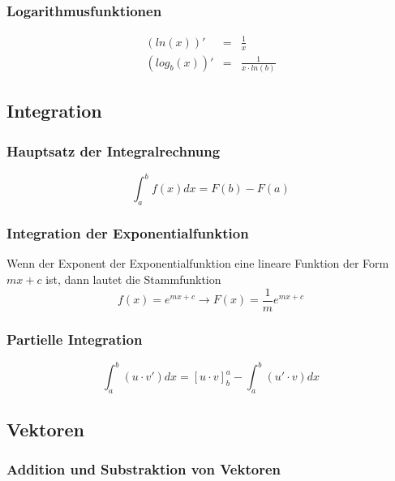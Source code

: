 \subsubsection{Logarithmusfunktionen}
\label{ssub:logarithmusfunktionen}	
\begin{eqnarray}
	(ln(x))' &=& \frac{1}{x} \\
	(log_b(x))' &=& \frac{1}{x \cdot ln(b)}
\end{eqnarray}	

\subsection{Integration} 
\label{sub:integration}

\subsubsection{Hauptsatz der Integralrechnung} 
\label{ssub:hauptsatz_der_integralrechnung}

\begin{equation}
	\int_a^b f(x)dx = F(b) - F(a)
\end{equation}

\subsubsection{Integration der Exponentialfunktion}
\label{ssub:integration_der_exponentialfunktion}

Wenn der Exponent der Exponentialfunktion eine lineare Funktion der Form $mx+c$ ist, dann lautet die Stammfunktion
\begin{equation}
	f(x) = e^{mx+c} \rightarrow F(x) = \frac{1}{m} e^{mx+c}
\end{equation}

\subsubsection{Partielle Integration}
\label{ssub:partielle_integration}
\begin{equation}
	\int_a^b (u \cdot v') dx = \left[u \cdot v \right]^a_b - \int_a^b (u' \cdot v) dx
\end{equation}

\subsection{Vektoren} 
\label{sub:vektoren}

\subsubsection{Addition und Substraktion von Vektoren} 
\label{ssub:addition_und_substraktion_von_vektoren}

